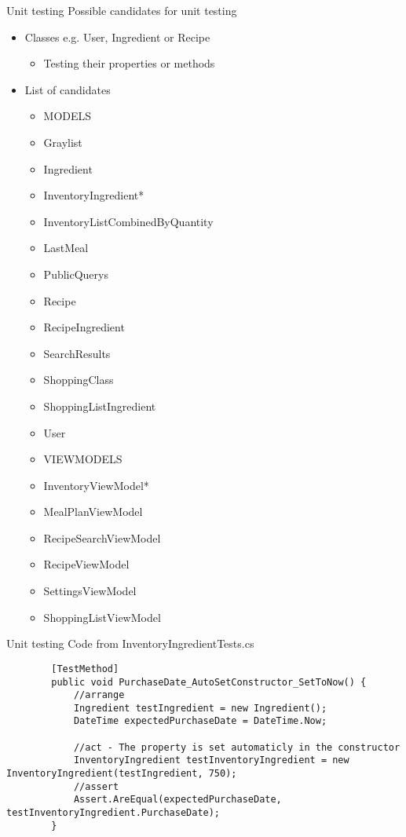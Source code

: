 \begin{frame}[fragile] {Unit testing} {Possible candidates for unit testing}

	\begin{itemize}
		\item Classes e.g. User, Ingredient or Recipe
			\begin{itemize}
				\item Testing their properties or methods
			\end{itemize}
		\item List of candidates	
			\begin{itemize}	
				\item MODELS								
				\item Graylist
				\item Ingredient
				\item InventoryIngredient*
				\item InventoryListCombinedByQuantity
				\item LastMeal
				\item PublicQuerys
				\item Recipe
				\item RecipeIngredient
				\item SearchResults
				\item ShoppingClass
				\item ShoppingListIngredient
				\item User	
				\item VIEWMODELS
				\item InventoryViewModel*
				\item MealPlanViewModel
				\item RecipeSearchViewModel
				\item RecipeViewModel
				\item SettingsViewModel
				\item ShoppingListViewModel				
			\end{itemize}										
	\end{itemize}
		
\end{frame}

\begin{frame}[fragile] {Unit testing} {Code from InventoryIngredientTests.cs}
	\begin{lstlisting}
		[TestMethod]
		public void PurchaseDate_AutoSetConstructor_SetToNow() {
			//arrange
			Ingredient testIngredient = new Ingredient();
			DateTime expectedPurchaseDate = DateTime.Now;
			
			//act - The property is set automaticly in the constructor
			InventoryIngredient testInventoryIngredient = new InventoryIngredient(testIngredient, 750);
			//assert
			Assert.AreEqual(expectedPurchaseDate, testInventoryIngredient.PurchaseDate); 
		}
	\end{lstlisting}
\end{frame}